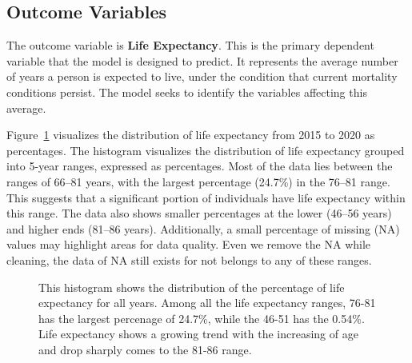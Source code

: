 \documentclass[
  letterpaper,
  DIV=11,
  numbers=noendperiod]{scrartcl}
\begin{document}
\subsection{Outcome Variables}\label{outcome-variables}

The outcome variable is \textbf{Life Expectancy}. This is the primary
dependent variable that the model is designed to predict. It represents
the average number of years a person is expected to live, under the
condition that current mortality conditions persist. The model seeks to
identify the variables affecting this average.

Figure~\ref{fig-expectancy} visualizes the distribution of life
expectancy from 2015 to 2020 as percentages. The histogram visualizes
the distribution of life expectancy grouped into 5-year ranges,
expressed as percentages. Most of the data lies between the ranges of
66--81 years, with the largest percentage (24.7\%) in the 76--81 range.
This suggests that a significant portion of individuals have life
expectancy within this range. The data also shows smaller percentages at
the lower (46--56 years) and higher ends (81--86 years). Additionally, a
small percentage of missing (NA) values may highlight areas for data
quality. Even we remove the NA while cleaning, the data of NA still
exists for not belongs to any of these ranges.

\begin{figure}


\caption{\label{fig-expectancy}This histogram shows the distribution of
the percentage of life expectancy for all years. Among all the life
expectancy ranges, 76-81 has the largest percenage of 24.7\%, while the
46-51 has the 0.54\%. Life expectancy shows a growing trend with the
increasing of age and drop sharply comes to the 81-86 range.}

\end{figure}%
\end{document}
